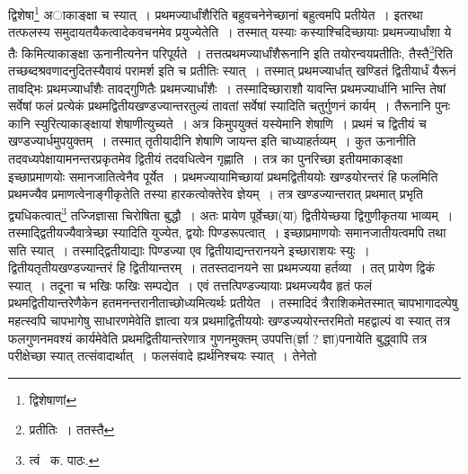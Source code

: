 \documentclass[11pt, openany]{book}
\begin{document}
\noindent द्विशेषा\renewcommand{\thefootnote}{१}\footnote{द्विशेषाणां} अाकाङ्क्षा च स्यात्~। प्रथमज्यार्धांशैरिति बहुवचनेनेच्छानां बहुत्वमपि प्रतीयेत~। इतरथा तत्फलस्य समुदायतयैकत्वादेकवचनमेव प्रयुज्येतेति~। तस्मात् यस्याः कस्याश्चिदिच्छायाः प्रथमज्यार्धांशा ये तैः किमित्याकाङ्क्षा ऊनानीत्यनेन परिपूर्यते~। तत्तत्प्रथमज्यार्धांशैरूनानि इति तयोरन्वयप्रतीतिः, तैस्तै\renewcommand{\thefootnote}{२}\footnote{प्रतीतिः~। ततस्तै}रिति तच्छब्दश्रवणादनुदितस्यैवायं परामर्श इति च प्रतीतिः स्यात्~। तस्मात् प्रथमज्यार्धात् खण्डितं द्वितीयार्धं यैरूनं तावद्भिः प्रथमज्यार्धांशैः तावद्गुणितैः प्रथमज्यार्धांशैः~। तस्मादिच्छाराशौ यावन्ति
प्रथमज्यार्धानि भान्ति तेषां सर्वेषां फलं प्रत्येकं प्रथमद्वितीयखण्डज्यान्तरतुल्यं तावतां सर्वेषां स्यादिति चतुर्गुणनं कार्यम्~। तैरूनानि पुनः कानि
स्युरित्याकाङ्क्षायां शेषाणीत्युच्यते~। अत्र किमुपयुक्तं यस्येमानि शेषाणि~। प्रथमं च द्वितीयं च खण्डज्यार्धमुपयुक्तम्~। तस्मात् तृतीयादीनि शेषाणि
जायन्त इति चाध्याहर्तव्यम्~। कुत ऊनानीति तदवध्यपेक्षायामनन्तरप्रकृतमेव द्वितीयं तदवधित्वेन गृह्णाति~। तत्र का पुनरिच्छा इतीयमाकाङ्क्षा इच्छाप्रमाणयोः समानजातित्वेनैव पूर्येत~। प्रथमज्यायामिच्छायां प्रथमद्वितीययोः खण्डयोरन्तरं हि फलमिति प्रथमज्यैव प्रमाणत्वेनाङ्गीकृतेति तस्या हारकत्वोक्तेरेव ज्ञेयम्~। तत्र खण्डज्यान्तरात् प्रथमात् प्रभृति द्व्यधिकत्वात्\renewcommand{\thefootnote}{३}\footnote{त्वं \textendash\ क. पाठः.} तज्जिज्ञासा चिरोषिता बुद्धौ~। अतः प्रायेण पूर्वेच्छा(या)
द्वितीयेच्छया द्विगुणीकृतया भाव्यम्~। तस्माद्द्वितीयज्यैवात्रेच्छा स्यादिति युज्येत, द्वयोः पिण्डरूपत्वात्~। इच्छाप्रमाणयोः समानजातीयत्वमपि तथा सति स्यात्~। तस्माद्द्वितीयाद्याः पिण्डज्या एव द्वितीयाद्यन्तरानयने इच्छाराशयः स्युः~। द्वितीयतृतीयखण्डज्यान्तरं हि द्वितीयान्तरम्~। ततस्तदानयने सा प्रथमज्यया हर्तव्या~। तत् प्रायेण द्विकं स्यात्~। तदूना च भखिः फखिः सम्पद्येत~। एवं तत्तत्पिण्डज्यायाः प्रथमज्ययैव हृतं फलं प्रथमद्वितीयान्तरेणैकेन हतमनन्तरानीताच्छोध्यमित्यर्थः प्रतीयेत~। तस्मादिदं त्रैराशिकमेतस्मात् चापभागादल्पेषु महत्स्वपि चापभागेषु साधारणमेवेति ज्ञात्वा यत्र प्रथमाद्वितीययोः खण्डज्ययोरन्तरमितो महद्वाल्पं वा स्यात् तत्र फलगुणनमवश्यं कार्यमेवेति प्रथमद्वितीयान्तरेणात्र गुणनमुक्तम् उपपत्ति(र्ज्ञा ? ज्ञा)पनायेति बुद्ध्वापि तत्र परीक्षेच्छा स्यात् तत्संवादार्थात्~। फलसंवादे ह्यर्थनिश्चयः स्यात्~। तेनेतो

\newpage
\end{document}
